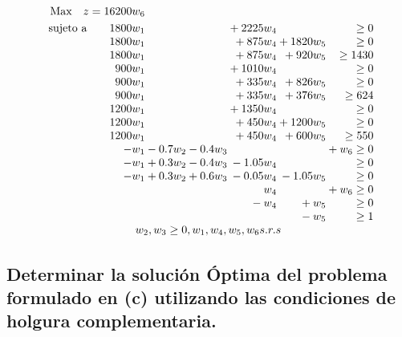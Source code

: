 \documentclass[10pt, a4paper]{article}
\begin{document}
			\[
			  \begin{array}{r@{}r@{}r@{}r@{}r@{}r@{}l}
			    \text{Max} \quad z = 16200w_{6} \\[\jot]
			    \text{sujeto a}\qquad 	1800w_{1} 	&{} 		&{} 		&{} +2225w_{4} 	&{} 			&{}			\geq 0 \\
			                     		1800w_{1} 	&{} 		&{} 		&{} +875w_{4}	&{} +1820w_{5}	&{}			\geq 0 \\
								 		1800w_{1} 	&{} 		&{} 		&{} +875w_{4}	&{} +920w_{5}	&{} 		\geq 1430 \\
								 		900w_{1}  	&{} 		&{} 		&{} +1010w_{4}	&{} 			&{}     	\geq 0  \\
								 		900w_{1}  	&{} 		&{} 		&{} +335w_{4}	&{} +826w_{5}	&{}  		\geq 0 \\
										900w_{1}    &{} 		&{} 		&{} +335w_{4} 	&{} +376w_{5}	&{}  		\geq 624 \\
										1200w_{1}   &{}  		&{} 		&{} +1350w_{4}	&{} 			&{}  		\geq 0 \\
										1200w_{1}   &{}  		&{} 		&{} +450w_{4}	&{} +1200w_{5}	&{} 		\geq 0 \\
										1200w_{1}  	&{} 		&{} 	 	&{} +450w_{4}	&{} +600w_{5}	&{} 		\geq 550 \\
										-w_{1}		&{}-0.7 w_{2}&{}-0.4w_{3}&{} 			&{} 			&{} + w_{6} \geq 0 \\
										-w_{1}		&{}+0.3 w_{2}&{}-0.4w_{3}&{}-1.05w_{4} 	&{} 			&{} 		\geq 0 \\
										-w_{1}		&{}+0.3 w_{2}&{}+0.6w_{3}&{}-0.05w_{4} 	&{} -1.05w_{5}	&{} 		\geq 0 \\
													&{} 		&{} 	 	&{}w_{4} 		&{} 			&{} + w_{6}	\geq 0 \\
													&{} 		&{}  		&{}-w_{4} 	 	&{} +w_{5}		&{}			\geq 0 \\
													&{} 		&{}  		&{} 			&{} -w_{5}		&{}			\geq 1 \\
			     \multicolumn{6}{c}{ w_{2}, w_{3} \geq 0, w_{1}, w_{4}, w_{5}, w_{6} s.r.s}


			  \end{array}
			\]


		\subsection{Determinar la solución Óptima del problema formulado en (c) utilizando las condiciones de holgura complementaria.}
\end{document}
